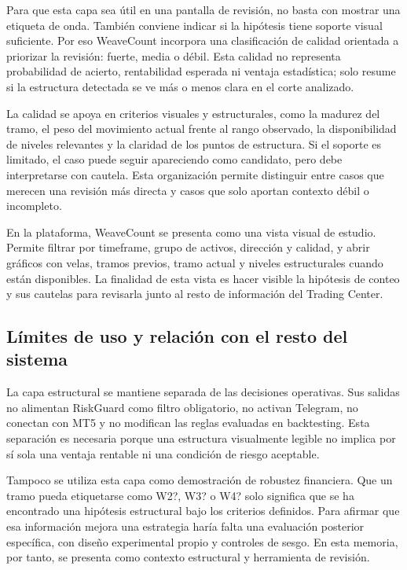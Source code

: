 Para que esta capa sea \'util en una pantalla de revisi\'on, no basta con mostrar
una etiqueta de onda. Tambi\'en conviene indicar si la hip\'otesis tiene soporte
visual suficiente. Por eso WeaveCount incorpora una clasificaci\'on de calidad
orientada a priorizar la revisi\'on: fuerte, media o d\'ebil. Esta calidad no
representa probabilidad de acierto, rentabilidad esperada ni ventaja
estad\'istica; solo resume si la estructura detectada se ve m\'as o menos clara
en el corte analizado.

La calidad se apoya en criterios visuales y estructurales, como la madurez del
tramo, el peso del movimiento actual frente al rango observado, la
disponibilidad de niveles relevantes y la claridad de los puntos de estructura.
Si el soporte es limitado, el caso puede seguir apareciendo como candidato, pero
debe interpretarse con cautela. Esta organizaci\'on permite distinguir entre
casos que merecen una revisi\'on m\'as directa y casos que solo aportan contexto
d\'ebil o incompleto.

En la plataforma, WeaveCount se presenta como una vista visual de estudio.
Permite filtrar por timeframe, grupo de activos, direcci\'on y calidad, y
abrir gr\'aficos con velas, tramos previos, tramo actual y niveles estructurales
cuando est\'an disponibles. La finalidad de esta vista es hacer visible la
hip\'otesis de conteo y sus cautelas para revisarla junto al resto de informaci\'on
del Trading Center.

\subsection{L\'imites de uso y relaci\'on con el resto del sistema}
\label{subsec:limites-wavecount-weavecount}

La capa estructural se mantiene separada de las decisiones operativas. Sus
salidas no alimentan RiskGuard como filtro obligatorio, no activan Telegram, no
conectan con MT5 y no modifican las reglas evaluadas en backtesting. Esta
separaci\'on es necesaria porque una estructura visualmente legible no implica
por s\'i sola una ventaja rentable ni una condici\'on de riesgo aceptable.

Tampoco se utiliza esta capa como demostraci\'on de robustez financiera. Que un
tramo pueda etiquetarse como W2?, W3? o W4? solo significa que se ha encontrado
una hip\'otesis estructural bajo los criterios definidos. Para afirmar que esa
informaci\'on mejora una estrategia har\'ia falta una evaluaci\'on posterior
espec\'ifica, con dise\~no experimental propio y controles de sesgo. En esta
memoria, por tanto, se presenta como contexto estructural y herramienta de
revisi\'on.

